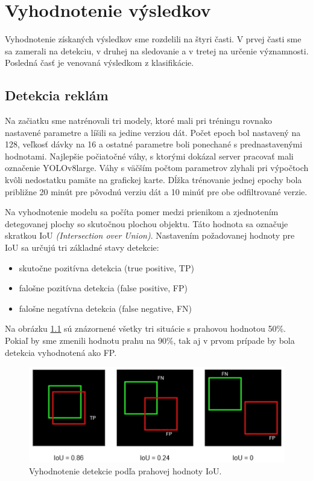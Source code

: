 \chapter{Vyhodnotenie výsledkov}\label{chap:results}

Vyhodnotenie získaných výsledkov sme rozdelili na štyri časti. V prvej časti sme sa zamerali na detekciu, v druhej na sledovanie a v tretej na určenie významnosti. Posledná časť je venovaná výsledkom z klasifikácie.

\section{Detekcia reklám}

Na začiatku sme natrénovali tri modely, ktoré mali pri tréningu rovnako nastavené parametre a líšili sa jedine verziou dát. Počet epoch bol nastavený na 128, veľkosť dávky na 16 a ostatné parametre boli ponechané s prednastavenými hodnotami. Najlepšie počiatočné váhy, s ktorými dokázal server pracovať mali označenie YOLOv8large. Váhy s väčším počtom parametrov zlyhali pri výpočtoch kvôli nedostatku pamäte na grafickej karte. Dĺžka trénovanie jednej epochy bola približne 20 minút pre pôvodnú verziu dát a 10 minúť pre obe odfiltrované verzie.

Na vyhodnotenie modelu sa počíta pomer medzi prienikom a zjednotením detegovanej plochy so skutočnou plochou objektu. Táto hodnota sa označuje skratkou IoU \textit{(Intersection over Union)}. Nastavením požadovanej hodnoty pre IoU sa určujú tri základné stavy detekcie:

\begin{itemize}
  \item skutočne pozitívna detekcia (true positive, TP)
  \item falošne pozitívna detekcia (false positive, FP)
  \item falošne negatívna detekcia (false negative, FN)
\end{itemize}

Na obrázku \ref{img:ious} sú znázornené všetky tri situácie s prahovou hodnotou 50\%. Pokiaľ by sme zmenili hodnotu prahu na 90\%, tak aj v prvom prípade by bola detekcia vyhodnotená ako FP.

\begin{figure}[ht]
    \centering
    \includegraphics[width=1\textwidth]{images/05/ious.png}
    \caption{Vyhodnotenie detekcie podľa prahovej hodnoty IoU.}
    \label{img:ious}
\end{figure}

